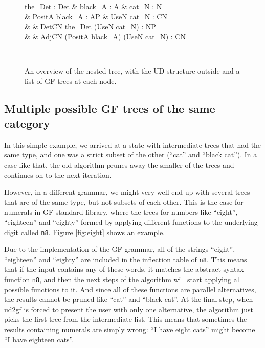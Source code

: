 \begin{figure}[H]
    \centering
    \setlength{\unitlength}{0.2mm}
    \begin{dependency}
        \begin{deptext}[column sep=0.4cm]
              the\_Det : Det \& black\_A : A \& cat\_N : N \\
            \& PositA black\_A : AP \& UseN cat\_N : CN \\
            \& \& DetCN the\_Det (UseN cat\_N) : NP \\
            \& \& AdjCN (PositA black\_A) (UseN cat\_N) : CN \\
        \end{deptext}
    \end{dependency} \\
    \caption{An overview of the nested tree, with the UD structure outside and a list of GF-trees at each node.}
    \label{fig:final_nested_compact}
\end{figure}

\subsection{Multiple possible GF trees of the same category}
\label{sec:multiple_trees}

In this simple example, we arrived at a state with intermediate trees that had the same type, and one was a strict subset of the other (``cat'' and ``black cat''). In a case like that, the old algorithm prunes away the smaller of the trees and continues on to the next iteration. 

However, in a different grammar, we might very well end up with several trees that are of the same type, but not subsets of each other. This is the case for numerals in \ac{GF} standard library, where the trees for numbers like ``eight'', ``eighteen'' and ``eighty'' formed by applying different functions to the underlying digit called \texttt{n8}. Figure \ref{fig:eight} shows an example.

Due to the implementation of the \ac{GF} grammar, all of the strings ``eight'', ``eighteen'' and ``eighty'' are included in the inflection table of \texttt{n8}. This means that if the input contains any of these words, it matches the abstract syntax function \texttt{n8}, and then the next steps of the algorithm will start applying all possible functions to it. And since all of these functions are parallel alternatives, the results cannot be pruned like ``cat'' and ``black cat''. At the final step, when ud2gf is forced to present the user with only one alternative, the algorithm just picks the first tree from the intermediate list. This means that sometimes the results containing numerals are simply wrong: ``I have eight cats'' might become ``I have eighteen cats''.

